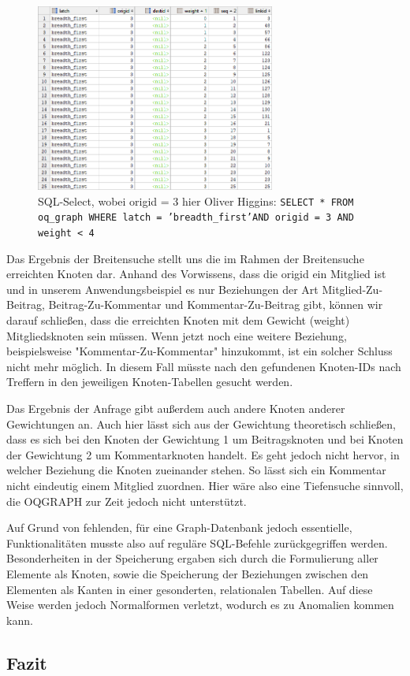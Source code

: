 \begin{figure}[h]
	\caption{SQL-Select, wobei origid = 3 hier Oliver Higgins: \newline
		\texttt{SELECT * FROM oq\_graph WHERE latch = 'breadth\_first'\newline AND origid = 3 AND weight < 4}
	}
	\centering
	\includegraphics[width=0.7\textwidth]{images/oqgraph-select.png}
\end{figure}

Das Ergebnis der Breitensuche stellt uns die im Rahmen der Breitensuche erreichten Knoten dar. Anhand des Vorwissens, dass die origid ein Mitglied ist und in unserem Anwendungsbeispiel es nur Beziehungen der Art Mitglied-Zu-Beitrag, Beitrag-Zu-Kommentar und Kommentar-Zu-Beitrag gibt, können wir darauf schließen, dass die erreichten Knoten mit dem Gewicht (weight) Mitgliedsknoten sein müssen. Wenn jetzt noch eine weitere Beziehung, beispielsweise "Kommentar-Zu-Kommentar" hinzukommt, ist ein solcher Schluss nicht mehr möglich. In diesem Fall müsste nach den gefundenen Knoten-IDs nach Treffern in den jeweiligen Knoten-Tabellen gesucht werden.

Das Ergebnis der Anfrage gibt außerdem auch andere Knoten anderer Gewichtungen an. Auch hier lässt sich aus der Gewichtung theoretisch schließen, dass es sich bei den Knoten der Gewichtung 1 um Beitragsknoten und bei Knoten der Gewichtung 2 um Kommentarknoten handelt. Es geht jedoch nicht hervor, in welcher Beziehung die Knoten zueinander stehen. So lässt sich ein Kommentar nicht eindeutig einem Mitglied zuordnen. Hier wäre also eine Tiefensuche sinnvoll, die OQGRAPH zur Zeit jedoch nicht unterstützt.

Auf Grund von fehlenden, für eine Graph-Datenbank jedoch essentielle, Funktionalitäten musste also auf reguläre SQL-Befehle zurückgegriffen werden. Besonderheiten in der Speicherung ergaben sich durch die Formulierung aller Elemente als Knoten, sowie die Speicherung der Beziehungen zwischen den Elementen als Kanten in einer gesonderten, relationalen Tabellen. Auf diese Weise werden jedoch Normalformen verletzt, wodurch es zu Anomalien kommen kann.

\subsection{Fazit}
